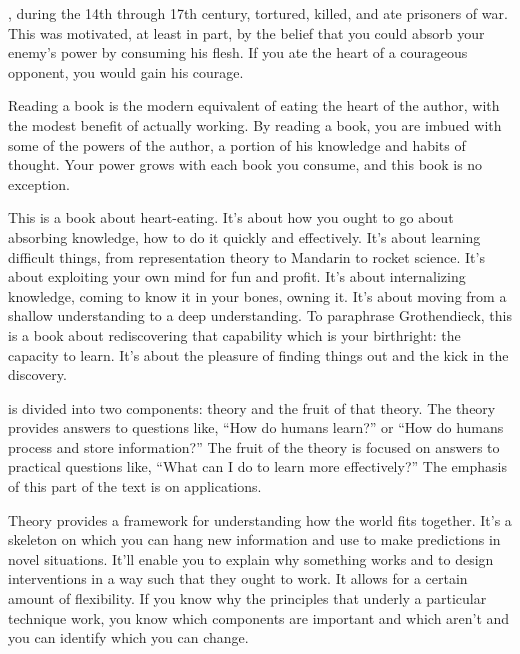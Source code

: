 , during the 14th through 17th century, 
tortured, killed, and ate prisoners of war. \cite{abler1980} This was motivated, at least in part, by the belief that you could absorb your enemy's power by consuming his flesh. If you ate the heart of a courageous opponent, you would gain his courage.

Reading a book is the modern equivalent of eating the heart of the author, with the modest benefit of actually working. By reading a book, you are imbued with some of the powers of the author, a portion of his knowledge and habits of thought. Your power grows with each book you consume, and this book is no exception. 

This is a book about heart-eating. It's about how you ought to go about absorbing knowledge, how to do it quickly and effectively. It's about learning difficult things, from representation theory to
Mandarin to rocket science. It's about exploiting your own mind for fun and profit. It's about internalizing knowledge, coming to know it in your bones, owning it. It's about moving from a shallow understanding to a deep understanding. To paraphrase Grothendieck,\cite{grothendieck1985recoltes} this is a book about rediscovering that capability which is your birthright: the capacity to learn. It's about the pleasure of finding things out and the kick in the discovery. 

 is divided into two components: theory and the fruit of that theory. The theory provides answers to questions like, ``How do humans learn?'' or ``How do humans process and store information?'' The fruit of the theory is focused on answers to practical questions like, ``What can I do to learn more effectively?'' The emphasis of this part of the text is on applications.

Theory provides a framework for understanding how the world fits together. It's a skeleton on which you can hang new information and use to make predictions in novel situations. It'll enable you to explain why something works and to design interventions in a way such that they ought to work. It allows for a certain amount of flexibility. If you know why the principles that underly a particular technique work, you know which components are important and which aren't and you can identify which you can change.

